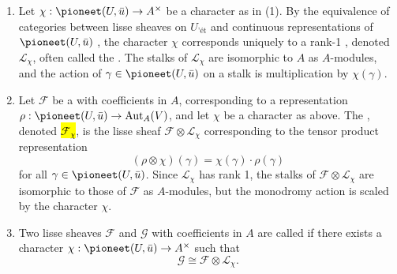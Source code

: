 \begin{definition}
\begin{enumerate}
        \item Let $\chi: \pioneet(U, \bar{u}) \to A^\times$ be a character as in (1). By the equivalence of categories between lisse sheaves on $U_{\text{'\'et}}$ and continuous representations of $\pioneet(U, \bar{u})$
        , the character $\chi$ corresponds uniquely to a rank-1 , denoted $\mathcal{L}_\chi$, often called the . The stalks of $\mathcal{L}_\chi$ are isomorphic to $A$ as $A$-modules, and the action of $\gamma \in \pioneet(U, \bar{u})$ on a stalk is multiplication by $\chi(\gamma)$.

        \item Let $\mathscr{F}$ be a  with coefficients in $A$, corresponding to a representation $\rho: \pioneet(U, \bar{u}) \to \text{Aut}_A(V)$, and let $\chi$ be a character as above. The , denoted \hl{$\mathscr{F}_\chi$}, is the lisse sheaf $\mathscr{F} \otimes \mathcal{L}_\chi$ corresponding to the tensor product representation $$(\rho \otimes \chi)(\gamma) = \chi(\gamma) \cdot \rho(\gamma)$$
        for all $\gamma \in \pioneet(U, \bar{u})$. Since $\mathcal{L}_\chi$ has rank 1, the stalks of $\mathscr{F} \otimes \mathcal{L}_\chi$ are isomorphic to those of $\mathscr{F}$ as $A$-modules, but the monodromy action is scaled by the character $\chi$.

        \item Two lisse sheaves $\mathscr{F}$ and $\mathscr{G}$ with coefficients in $A$ are called  if there exists a character $\chi: \pioneet(U, \bar{u}) \to A^\times$ such that
        $$\mathscr{G} \cong \mathscr{F} \otimes \mathcal{L}_\chi.$$
    \end{enumerate}
\end{definition}